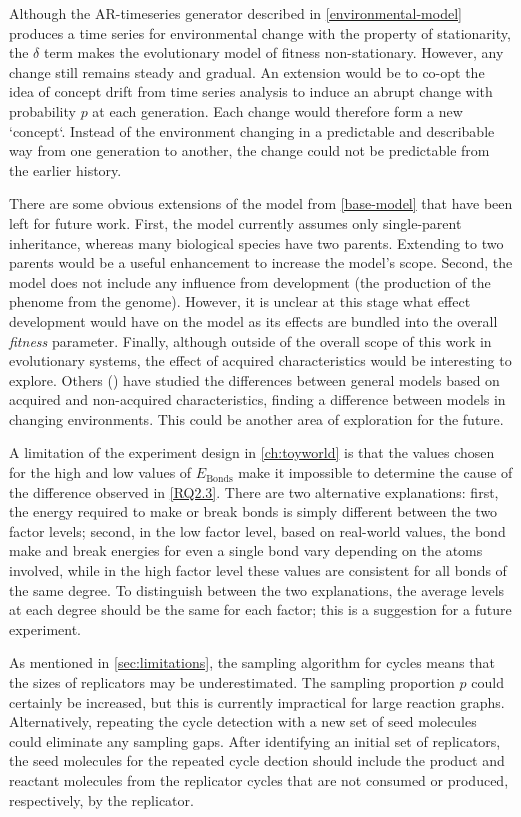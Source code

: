 Although the AR-timeseries generator described in \cref{environmental-model} produces a time series for environmental change with the property of stationarity, the $\delta$ term makes the evolutionary model of fitness non-stationary. However, any change still remains steady and gradual. An extension would be to co-opt the idea of concept drift from time series analysis to induce an abrupt change with probability $p$ at each generation. Each change would therefore form a new `concept`. Instead of the environment changing in a predictable and describable way from one generation to another, the change could not be predictable from the earlier history.

There are some obvious extensions of the model from \cref{base-model} that have been left for future work. First, the model currently assumes only single-parent inheritance, whereas many biological species have two parents. Extending to two parents would be a useful enhancement to increase the model's scope. Second, the model does not include any influence from development (the production of the phenome from the genome). However, it is unclear at this stage what effect development would have on the model as its effects are bundled into the overall \emph{fitness} parameter. Finally, although outside of the overall scope of this work in evolutionary systems, the effect of acquired characteristics would be interesting to explore. Others (\eg \textcite{Gaucherel2012,Paenke:2007ie,Sasaki:2000dq}) have studied the differences between general models based on acquired and non-acquired characteristics, finding a difference between models in changing environments. This could be another area of exploration for the future.

A limitation of the experiment design in \cref{ch:toyworld} is that the values chosen for the high and low values of $E_\mathrm{Bonds}$ make it impossible to determine the cause of the difference observed in \cref{RQ2.3}. There are two alternative explanations: first, the energy required to make or break bonds is simply different between the two factor levels; second, in the low factor level, based on real-world values, the bond make and break energies for even a single bond vary depending on the atoms involved, while in the high factor level these values are consistent for all bonds of the same degree. To distinguish between the two explanations, the average levels at each degree should be the same for each factor; this is a suggestion for a future experiment.

As mentioned in \cref{sec:limitations}, the sampling algorithm for cycles means that the sizes of replicators may be underestimated. The sampling proportion $p$ could certainly be increased, but this is currently impractical for large reaction graphs. Alternatively, repeating the cycle detection with a new set of seed molecules could eliminate any sampling gaps. After identifying an initial set of replicators, the seed molecules for the repeated cycle dection should include the product and reactant molecules from the replicator cycles that are not consumed or produced, respectively, by the replicator.

